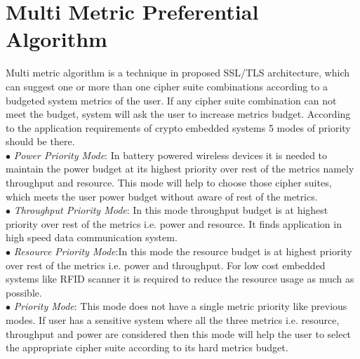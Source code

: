 \documentclass[3p,times]{elsarticle}
\begin{document}
\section{Multi Metric Preferential Algorithm}
\label{sec:multi_metric}
Multi metric algorithm is a technique in proposed SSL/TLS architecture, which can suggest one or more than one cipher suite combinations according to a budgeted system metrics of the user. If any cipher suite combination can not meet the budget, system will ask the user to increase metrics  budget.
According to the application requirements of crypto embedded systems 5 modes of priority should be there.\\
$\bullet$ \textit{Power Priority Mode}: In battery powered wireless devices it is needed to maintain the power budget at its highest priority over rest of the metrics namely throughput and resource. This mode will help to choose those cipher suites, which meets the user power budget without aware of rest of the metrics.\\ 
$\bullet$ \textit{Throughput Priority Mode}: In this mode throughput budget is at highest priority over rest of the metrics i.e. power and resource. It finds application in high speed data communication system.\\
$\bullet$ \textit{Resource Priority Mode}:In this mode the resource budget is at highest priority over rest of the metrics i.e. power and throughput. For low cost embedded systems like RFID scanner it is required to reduce the resource usage as much as possible. \\
$\bullet$ \textit{Priority Mode}: This mode does not have a single metric priority like previous modes. If user has a sensitive system where all the three metrics i.e. resource, throughput and power are considered then this mode will help the user to select the appropriate cipher suite according to its hard metrics budget.\\
\end{document}
